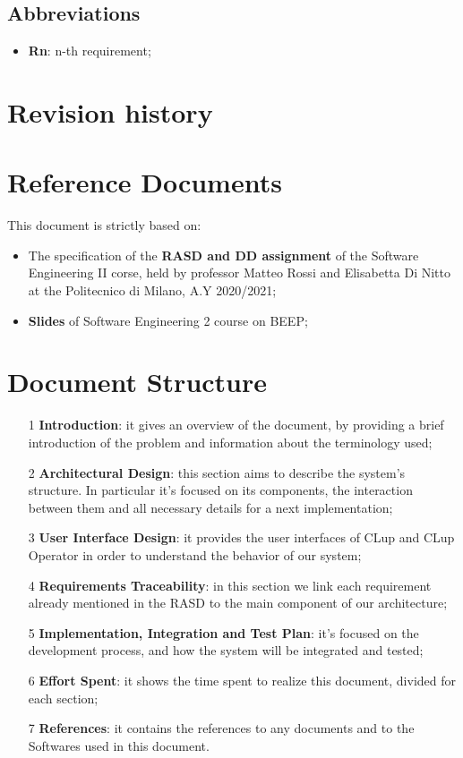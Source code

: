 \subsection{Abbreviations}
\begin{itemize}
\item \textbf{Rn}: n-th requirement;
\end{itemize}


\section{Revision history}
\section{Reference Documents}
This document is strictly based on:
\begin{itemize}
\item The specification of the \textbf{RASD and DD assignment} of the Software Engineering II corse, held by professor Matteo Rossi and Elisabetta Di Nitto at the Politecnico di Milano, A.Y 2020/2021;
\item \textbf{Slides} of Software Engineering 2 course on BEEP;
\end{itemize}
\section{Document Structure}
\begin{itemize}
\item[1]\textbf{Introduction}: it gives an overview of the document, by providing a brief introduction of the problem and information about the terminology used;
\item[2]\textbf{Architectural Design}: this section aims to describe the system’s structure. In particular it's focused on its components, the interaction between them and all necessary details for a next implementation; 
\item[3]\textbf{User Interface Design}: it provides the user interfaces of CLup and CLup Operator in order to understand the behavior of our system; 
\item[4]\textbf{Requirements Traceability}: in this section we link each requirement already mentioned in the RASD to the main component of our architecture;
\item[5]\textbf{Implementation, Integration and Test Plan}: it's focused on the development process, and how the system will be integrated and tested;
\item[6]\textbf{Effort Spent}: it shows the time spent to realize this document, divided for each section;
\item[7]\textbf{References}: it contains the references to any documents and to the Softwares used in this document.
\end{itemize}


